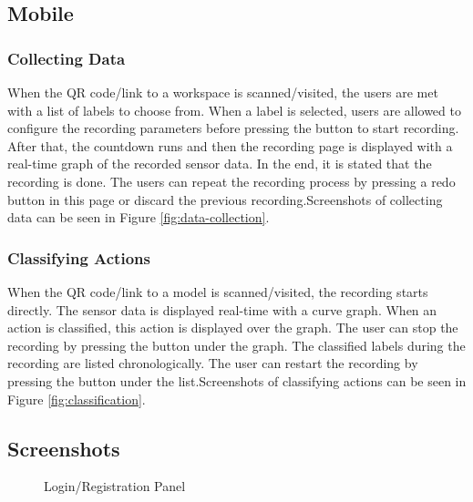 \subsection{Mobile}

\subsubsection{Collecting Data}
When the \gls{QR code}/link to a \gls{workspace} is scanned/visited, the users are met with a list of labels to choose from. When a label is selected, users are allowed to configure the recording parameters before pressing the button to start recording. After that, the countdown runs and then the recording page is displayed with a real-time graph of the recorded \gls{sensor} data. In the end, it is stated that the recording is done. The users can repeat the recording process by pressing a redo button in this page or discard the previous recording.\newline Screenshots of collecting data can be seen in Figure \ref{fig:data-collection}.

\subsubsection{Classifying Actions}
When the \gls{QR code}/link to a model is scanned/visited, the recording starts directly. The \gls{sensor} data is displayed real-time with a curve graph. When an action is classified, this action is displayed over the graph. The user can stop the recording by pressing the button under the graph. The classified labels during the recording are listed chronologically. The user can restart the recording by pressing the button under the list.\newline Screenshots of classifying actions can be seen in Figure \ref{fig:classification}.

\subsection{Screenshots}

\begin{figure}[hb]
    \centering
    \caption{Login/Registration Panel}
    \label{fig:login}
\end{figure}

